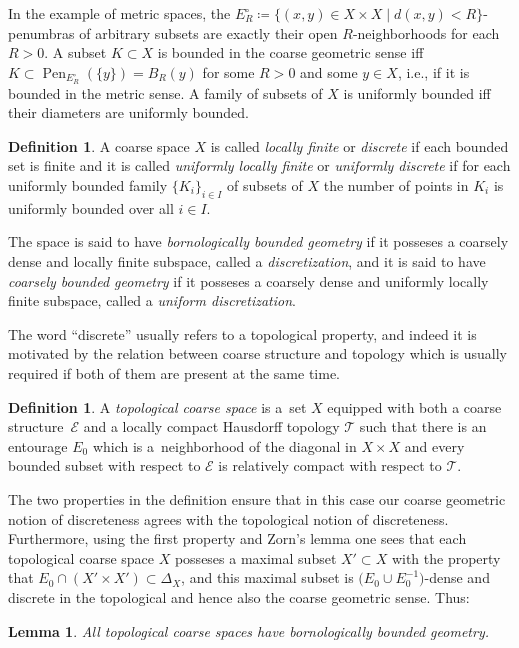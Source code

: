 \documentclass[pdftex]{sigma}
\numberwithin{equation}{section}
\newtheorem{lem}[thm]{Lemma}
\theoremstyle{definition}
\newtheorem{defn}[thm]{Definition}
\newcommand{\coarseStr}{\mathcal{E}}
\newcommand{\topology}{\mathcal{T}}
\newcommand{\Diag}[1][]{{\Delta_{#1}}}
\DeclareMathOperator{\Pen}{Pen}
\begin{document}
In the example of metric spaces, the $E_R^\circ\coloneqq\{(x,y)\in X\times X\mid d(x,y)<R\}$-penumbras of arbitrary subsets are exactly their open $R$-neigh\-bor\-hoods for each $R>0$.
A subset $K\subset X$ is bounded in the coarse geometric sense iff $K\subset \Pen_{E_R^\circ}(\{y\})=B_R(y)$ for some $R>0$ and some $y\in X$, i.e., if it is bounded in the metric sense.
A family of subsets of $X$ is uniformly bounded iff their diameters are uniformly bounded.

\begin{defn}\label{def:discreteboundedgeometry}
A coarse space $X$ is called \emph{locally finite} or \emph{discrete} if each bounded set is finite and it is called \emph{uniformly locally finite} or \emph{uniformly discrete} if for each uniformly bounded family $\{K_i\}_{i\in I}$ of subsets of $X$ the number of points in $K_i$ is uniformly bounded over all $i\in I$.

The space is said to have \emph{bornologically bounded geometry} if it posseses a coarsely dense and locally finite subspace, called a \emph{discretization}, and it is said to have \emph{coarsely bounded geometry} if it posseses a coarsely dense and uniformly locally finite subspace, called a \emph{uniform discretization}.
\end{defn}

The word ``discrete'' usually refers to a topological property, and indeed it is motivated by the relation between coarse structure and topology which is usually required if both of them are present at the same time.
\begin{defn}\label{defn:topcoarsespace}
A \emph{topological coarse space} is a~set $X$ equipped with both a coarse structure~$\coarseStr$ and a locally compact Hausdorff topology $\topology$ such that there is an entourage $E_0$ which is a~neighborhood of the diagonal in $X\times X$ and every bounded subset with respect to $\coarseStr$ is relatively compact with respect to $\topology$.
\end{defn}

The two properties in the definition ensure that in this case our coarse geometric notion of discreteness agrees with the topological notion of discreteness.
Furthermore, using the first property and Zorn's lemma one sees that each topological coarse space $X$ posseses a maximal subset $X'\subset X$ with the property that $E_0\cap (X'\times X')\subset \Diag[X]$, and this maximal subset is $\big(E_0\cup E_0^{-1}\big)$-dense and discrete in the topological and hence also the coarse geometric sense. Thus:
\begin{lem}\label{lem:topbbg}All topological coarse spaces have bornologically bounded geometry.
\end{lem}
\end{document}
